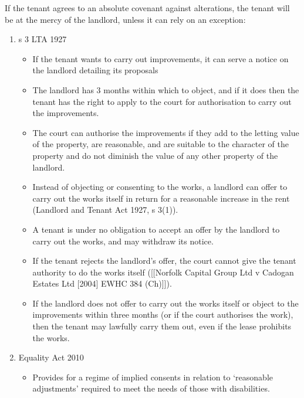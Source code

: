 \documentclass[
]{article}
\providecommand{\tightlist}{%
  \setlength{\itemsep}{0pt}\setlength{\parskip}{0pt}}
\begin{document}
If the tenant agrees to an absolute covenant against alterations, the
tenant will be at the mercy of the landlord, unless it can rely on an
exception:

\begin{enumerate}
\def\labelenumi{\arabic{enumi}.}
\tightlist
\item
  s 3 LTA 1927

  \begin{itemize}
  \tightlist
  \item
    If the tenant wants to carry out improvements, it can serve a notice
    on the landlord detailing its proposals
  \item
    The landlord has 3 months within which to object, and if it does
    then the tenant has the right to apply to the court for
    authorisation to carry out the improvements.
  \item
    The court can authorise the improvements if they add to the letting
    value of the property, are reasonable, and are suitable to the
    character of the property and do not diminish the value of any other
    property of the landlord.
  \item
    Instead of objecting or consenting to the works, a landlord can
    offer to carry out the works itself in return for a reasonable
    increase in the rent (Landlord and Tenant Act 1927, s 3(1)).
  \item
    A tenant is under no obligation to accept an offer by the landlord
    to carry out the works, and may withdraw its notice.
  \item
    If the tenant rejects the landlord's offer, the court cannot give
    the tenant authority to do the works itself ({[}{[}Norfolk Capital
    Group Ltd v Cadogan Estates Ltd {[}2004{]} EWHC 384 (Ch){]}{]}).
  \item
    If the landlord does not offer to carry out the works itself or
    object to the improvements within three months (or if the court
    authorises the work), then the tenant may lawfully carry them out,
    even if the lease prohibits the works.
  \end{itemize}
\item
  Equality Act 2010

  \begin{itemize}
  \tightlist
  \item
    Provides for a regime of implied consents in relation to `reasonable
    adjustments' required to meet the needs of those with disabilities.
  \end{itemize}
\end{enumerate}
\end{document}

